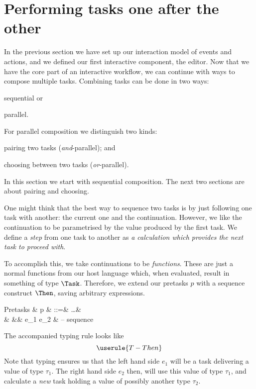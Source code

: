 
\section{Performing tasks one after the other}

In the previous section we have set up our interaction model of events and actions,
and we defined our first interactive component, the editor.
Now that we have the core part of an interactive workflow,
we can continue with ways to compose multiple tasks.
Combining tasks can be done in two ways:
\begin{enumerate*}
  \item sequential or
  \item parallel.
\end{enumerate*}
For parallel composition we distinguish two kinds:
\begin{enumerate*}[(a)]
  \item pairing two tasks (\emph{and}-parallel); and
  \item choosing between two tasks (\emph{or}-parallel).
\end{enumerate*}
In this section we start with sequential composition.
The next two sections are about pairing and choosing.

One might think that the best way to sequence two tasks is by just following one task with another:
the current one and the continuation.
However, we like the continuation to be parametrised by the value produced by the first task.
We define a \emph{step} from one task to another as \emph{a calculation which provides the next task to proceed with}.

To accomplish this,
we take continuations to be \emph{functions}.
These are just a normal functions from our host language which,
when evaluated, result in something of type $\Task$.
Therefore,
we extend our pretasks $p$ with a sequence construct $\Then$,
saving arbitrary expressions.
\begin{grammar}
  Pretasks
    & p & ::=& \ldots        & \\
    &   &\mid& e_1 \Then e_2 & – sequence \\
\end{grammar}
The accompanied typing rule looks like
\begin{equation*}
  \userule{T-Then}
\end{equation*}
Note that typing ensures us that the left hand side $e_1$ will be a task delivering a value of type $\tau_1$.
The right hand side $e_2$ then, will use this value of type $\tau_1$,
and calculate a \emph{new} task holding a value of possibly another type $\tau_2$.

